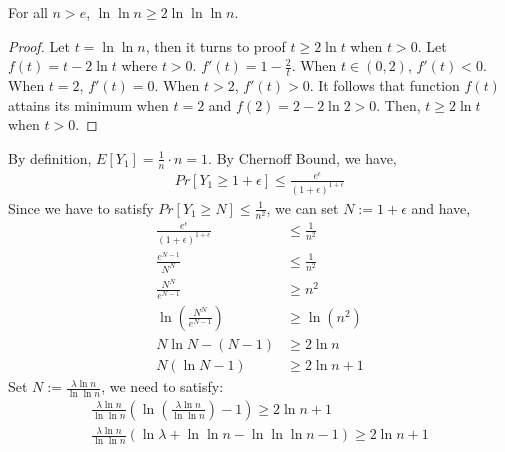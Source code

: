 \begin{claim}\label{1}
    For all $n> e$, $\ln \ln n  \ge 2\ln \ln \ln n$.
\end{claim}
\begin{proof}
    Let $t=\ln \ln n$, then it turns to proof $t\ge 2\ln t$ when $t> 0$.
    Let $f(t)=t-2\ln t$ where $t> 0$.
    $f'(t)=1-\frac{2}{t}$. 
    When $t\in (0,2)$, $f'(t)<0$.
    When $t=2$, $f'(t)=0$.
    When $t>2$, $f'(t)>0$.
    It follows that function $f(t)$ attains its minimum when $t=2$ and $f(2)=2-2\ln 2>0$.
    Then, $t\ge 2\ln t$ when $t>0$.

\end{proof}
\noindent By definition, $E[Y_1]=\frac{1}{n}\cdot n =1$.
By Chernoff Bound, we have,
\begin{align}
    \nonumber Pr[Y_1\ge 1+\epsilon] \le \frac{e^\epsilon}{(1+\epsilon)^{1+\epsilon}}
\end{align}
Since we have to satisfy $Pr[Y_1\ge N] \le \frac{1}{n^2}$, we can set $N:=1+\epsilon$ and have,
\begin{align}
    \nonumber \frac{e^\epsilon}{(1+\epsilon)^{1+\epsilon}}&\le \frac{1}{n^2}\\
    \nonumber \frac{e^{N-1}}{N^N}&\le \frac{1}{n^2}\\
    \nonumber \frac{N^N}{e^{N-1}}&\ge n^2\\
    \nonumber  \ln (\frac{N^N}{e^{N-1}})&\ge \ln (n^2)\\
    \nonumber N \ln N - (N-1) &\ge 2\ln n \\
    \nonumber N(\ln N -1) & \ge 2\ln n +1
\end{align}
Set $N:=\frac{\lambda \ln n}{\ln \ln n}$, we need to satisfy:
\begin{align}
    \nonumber \frac{\lambda \ln n}{\ln \ln n}(\ln (\frac{\lambda \ln n}{\ln \ln n})-1) \ge 2\ln n +1\\
    \nonumber \frac{\lambda \ln n}{\ln \ln n}(\ln \lambda +\ln\ln n -\ln \ln \ln n -1) \ge 2\ln n +1
\end{align}

